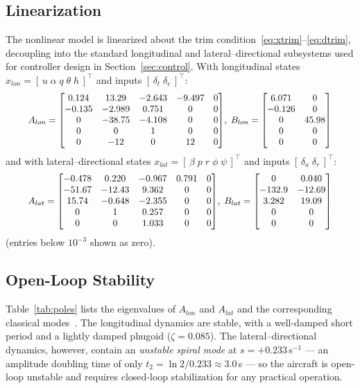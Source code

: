 \subsection{Linearization}
The nonlinear model is linearized about the trim
condition~\eqref{eq:xtrim}--\eqref{eq:dtrim}, decoupling into the standard
longitudinal and lateral--directional subsystems used for controller
design in Section~\ref{sec:control}. With longitudinal states
$x_{lon}=[\,u\;\alpha\;q\;\theta\;h\,]^{\!\top}$ and inputs
$[\,\delta_t\;\delta_e\,]^{\!\top}$:
\begin{equation}
\resizebox{.91\linewidth}{!}{$
A_{lon}=\begin{bmatrix}
0.124 & 13.29 & -2.643 & -9.497 & 0\\
-0.135 & -2.989 & 0.751 & 0 & 0\\
0 & -38.75 & -4.108 & 0 & 0\\
0 & 0 & 1 & 0 & 0\\
0 & -12 & 0 & 12 & 0
\end{bmatrix}\!,\;
B_{lon}=\begin{bmatrix}
6.071 & 0\\ -0.126 & 0\\ 0 & 45.98\\ 0 & 0\\ 0 & 0
\end{bmatrix}
$}
\end{equation}
and with lateral--directional states
$x_{lat}=[\,\beta\;p\;r\;\phi\;\psi\,]^{\!\top}$ and inputs
$[\,\delta_a\;\delta_r\,]^{\!\top}$:
\begin{equation}
\resizebox{.91\linewidth}{!}{$
A_{lat}=\begin{bmatrix}
-0.478 & 0.220 & -0.967 & 0.791 & 0\\
-51.67 & -12.43 & 9.362 & 0 & 0\\
15.74 & -0.648 & -2.355 & 0 & 0\\
0 & 1 & 0.257 & 0 & 0\\
0 & 0 & 1.033 & 0 & 0
\end{bmatrix}\!,\;
B_{lat}=\begin{bmatrix}
0 & 0.040\\ -132.9 & -12.69\\ 3.282 & 19.09\\ 0 & 0\\ 0 & 0
\end{bmatrix}
$}
\end{equation}
(entries below $10^{-3}$ shown as zero).

\subsection{Open-Loop Stability}
\label{sec:stability}
Table~\ref{tab:poles} lists the eigenvalues of $A_{lon}$ and $A_{lat}$ and
the corresponding classical modes~\cite{etkin1996dynamics,cook2007flight}. The longitudinal dynamics are stable,
with a well-damped short period and a lightly damped phugoid
($\zeta=0.085$). The lateral--directional dynamics, however, contain an
\emph{unstable spiral mode} at $s=+0.233$\,s$^{-1}$ --- an amplitude
doubling time of only $t_2=\ln 2/0.233 \approx 3.0$\,s --- so the aircraft
is open-loop unstable and requires closed-loop stabilization for any
practical operation.

